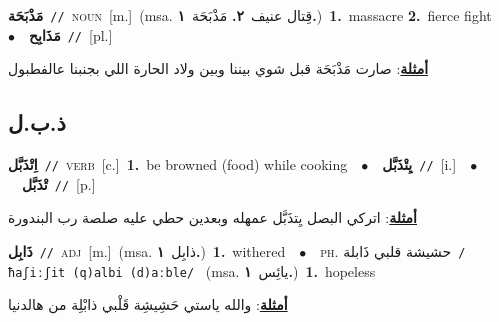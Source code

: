 \documentclass[10pt,a4paper,twoside]{article} %
\begin{document}
\begin{multicols}{2}
{\setlength\topsep{0pt}\textbf{\foreignlanguage{arabic}{مَذْبَحَة}}\ {\color{gray}\texttt{//}\color{black}}\ \textsc{noun}\ [m.]\ \color{gray}(msa. \foreignlanguage{arabic}{قِتال عنيف}~\foreignlanguage{arabic}{\textbf{٢.}}  \foreignlanguage{arabic}{مَذْبَحَة}~\foreignlanguage{arabic}{\textbf{١.}})\color{black}\ \textbf{1.}~massacre  \textbf{2.}~fierce fight\ \ $\bullet$\ \ \setlength\topsep{0pt}\textbf{\foreignlanguage{arabic}{مَذَابِح}}\ {\color{gray}\texttt{//}\color{black}}\ [pl.]\  \begin{flushright}\color{gray}\foreignlanguage{arabic}{\textbf{\underline{\foreignlanguage{arabic}{أمثلة}}}: صارت مَذْبَحَة قبل شوي بيننا وبين ولاد الحارة اللي بجنبنا عالفطبول}\end{flushright}\color{black}} \vspace{2mm}

\vspace{-3mm}
\subsection*{\color{blue}\foreignlanguage{arabic}{ذ.ب.ل}\color{blue}{}} 

{\setlength\topsep{0pt}\textbf{\foreignlanguage{arabic}{اِتْذَبَّل}}\ {\color{gray}\texttt{//}\color{black}}\ \textsc{verb}\ [c.]\ \textbf{1.}~be browned (food) while cooking\ \ $\bullet$\ \ \setlength\topsep{0pt}\textbf{\foreignlanguage{arabic}{يِتْذَبَّل}}\ {\color{gray}\texttt{//}\color{black}}\ [i.]\ \ $\bullet$\ \ \setlength\topsep{0pt}\textbf{\foreignlanguage{arabic}{تْذَبَّل}}\ {\color{gray}\texttt{//}\color{black}}\ [p.]\  \begin{flushright}\color{gray}\foreignlanguage{arabic}{\textbf{\underline{\foreignlanguage{arabic}{أمثلة}}}: اتركي البصل يِتذَبَّل عمهله وبعدين حطي عليه صلصة رب البندورة}\end{flushright}\color{black}} \vspace{2mm}

{\setlength\topsep{0pt}\textbf{\foreignlanguage{arabic}{ذَابِل}}\ {\color{gray}\texttt{//}\color{black}}\ \textsc{adj}\ [m.]\ \color{gray}(msa. \foreignlanguage{arabic}{ذابِل}~\foreignlanguage{arabic}{\textbf{١.}})\color{black}\ \textbf{1.}~withered\ \ $\bullet$\ \ \textsc{ph.} \color{gray} \foreignlanguage{arabic}{حشيشة قلبي ذَابلة}\color{black}\ {\color{gray}\texttt{/{\sffamily ħaʃiːʃit (q)albi (d)aːble}/}\color{black}}\ \color{gray} (msa. \foreignlanguage{arabic}{يائِس}~\foreignlanguage{arabic}{\textbf{١.}})\color{black}\ \textbf{1.}~hopeless\  \begin{flushright}\color{gray}\foreignlanguage{arabic}{\textbf{\underline{\foreignlanguage{arabic}{أمثلة}}}: والله ياستي حَشِيشِة قَلْبي ذابْلِة من هالدنيا}\end{flushright}\color{black}} \vspace{2mm}


\end{multicols}
\end{document}

